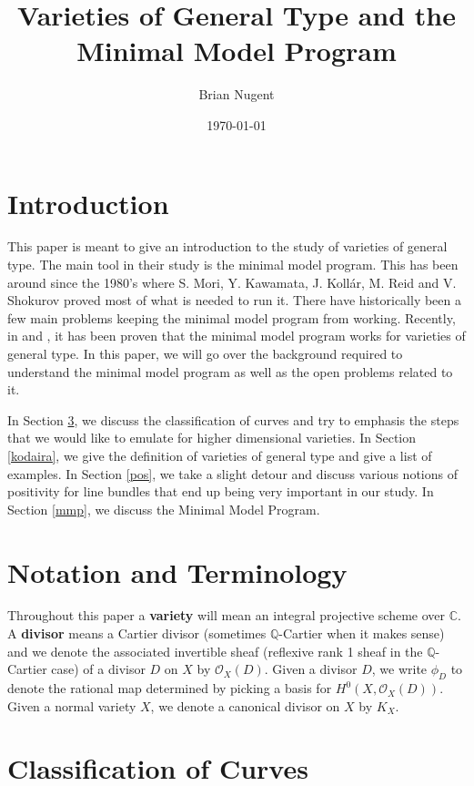 \documentclass[a4paper]{article}
\title{Varieties of General Type and the Minimal Model Program}
\author{Brian Nugent}
\date\today
\newcommand{\Oc}{\mathcal{O}}
\numberwithin{theorem}{section}
\begin{document}
\maketitle

\section{Introduction}



This paper is meant to give an introduction to the study of varieties of general type. The main tool in their study is the minimal model program. This has been around since the 1980's where S. Mori, Y. Kawamata, J. Kollár, M. Reid and V. Shokurov proved most of what is needed to run it. There have historically been a few main problems keeping the minimal model program from working. Recently, in \cite{MR2359343} and \cite{MR2601039}, it has been proven that the minimal model program works for varieties of general type. In this paper, we will go over the background required to understand the minimal model program as well as the open problems related to it.

In Section \ref{curves}, we discuss the classification of curves and try to emphasis the steps that we would like to emulate for higher dimensional varieties. In Section \ref{kodaira}, we give the definition of varieties of general type and give a list of examples. In Section \ref{pos}, we take a slight detour and discuss various notions of positivity for line bundles that end up being very important in our study. In Section \ref{mmp}, we discuss the Minimal Model Program.

\section{Notation and Terminology}
Throughout this paper a \textbf{variety} will mean an integral projective scheme over $\mathbb{C}$. A \textbf{divisor} means a Cartier divisor (sometimes $\mathbb{Q}$-Cartier when it makes sense) and we denote the associated invertible sheaf (reflexive rank 1 sheaf in the $\mathbb{Q}$-Cartier case) of a divisor $D$ on $X$ by $\Oc_X(D)$. Given a divisor $D$, we write $\phi_D$ to denote the rational map determined by picking a basis for $H^0(X,\Oc_X(D))$. Given a normal variety $X$, we denote a canonical divisor on $X$ by $K_X$.


\section{Classification of Curves}\label{curves}
\end{document}
